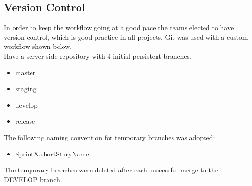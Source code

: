 \subsection{Version Control}
\label{sec:git}

In order to keep the workflow going at a good pace the teams elected to have version control, which is good practice in all projects. Git\cite{gitsite} was used with a custom workflow shown below. \\

Have a server side repository with 4 initial persistent branches.
\begin{itemize}
\item master
\item staging
\item develop
\item release
\end{itemize}

The following naming convention for temporary branches was adopted: 

\begin{itemize}
\item SprintX.shortStoryName
\end{itemize}

The temporary branches were deleted after each successful merge to the DEVELOP branch.

